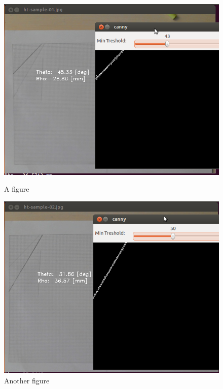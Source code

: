 \newpage
\begin{figure}
\centering
\begin{minipage}{.5\textwidth}
  \centering
  \includegraphics[width=.9\linewidth]{images/lab3-sample-01.png}
  \caption{A figure}
  \label{fig:test1}
\end{minipage}%
\begin{minipage}{.5\textwidth}
  \centering
  \includegraphics[width=.9\linewidth]{images/lab3-sample-02.png}
  \caption{Another figure}
  \label{fig:test2}
\end{minipage}
\end{figure}

